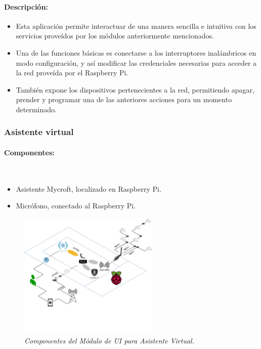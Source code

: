 \paragraph{Descripción:}

\begin{itemize}

\item Esta aplicación permite interactuar de una manera sencilla e intuitiva con los servicios proveídos por los módulos anteriormente mencionados.

\item Una de las funciones básicas es conectarse a los interruptores inalámbricos en modo configuración, y así modificar las credenciales necesarias para acceder a la red proveída por el Raspberry Pi.

\item También expone los dispositivos pertenecientes a la red, permitiendo apagar, prender y programar una de las anteriores acciones para un momento determinado.

\end{itemize}


\subsubsection{Asistente virtual}

\paragraph{Componentes:} ~

\begin{itemize}

\item Asistente Mycroft, localizado en Raspberry Pi.

\item Micrófono, conectado al Raspberry Pi.

\end{itemize}

\begin{figure}[h]
  \centering
  \includegraphics[width=0.6\textwidth, keepaspectratio]{images/mod-ui-mycroft}
  \caption{\textit{Componentes del Módulo de UI para Asistente Virtual.}}
  \label{fig:mod-ui-mycroft}
\end{figure}

